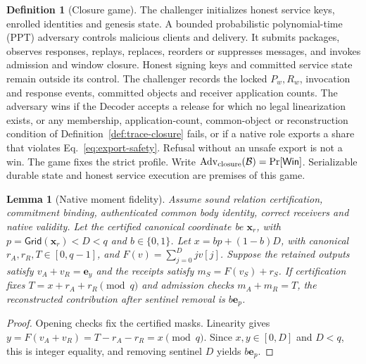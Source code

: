 \documentclass[conference,compsoc]{IEEEtran}
\theoremstyle{definition}
\newtheorem{definition}{Definition}[section]
\newtheorem{definition}{Definition}
\numberwithin{equation}{section}
\numberwithin{table}{section}
\numberwithin{figure}{section}
\theoremstyle{plain}
\newtheorem{lemma}{Lemma}[section]
\newtheorem{lemma}{Lemma}
\begin{document}
\begin{definition}[Closure game]
\label{game:closure}
The challenger initializes honest service keys, enrolled identities and genesis
state. A bounded probabilistic polynomial-time (PPT) adversary controls malicious clients and delivery. It
submits packages, observes responses, replays, replaces, reorders or suppresses
messages, and invokes admission and window closure. Honest signing keys and
committed service state remain outside its control. The challenger records the
locked \(P_w,R_w\), invocation and response events, committed objects and
receiver application counts. The
adversary wins if the Decoder accepts a release for which no legal
linearization exists, or any membership, application-count, common-object
or reconstruction condition of Definition~\ref{def:trace-closure} fails,
or if a
native role exports a share that violates Eq.~\eqref{eq:export-safety}.
Refusal without an unsafe export is not a win. The game fixes the strict
profile. Write
\(\operatorname{Adv}_{\rm closure}(\mathcal B)=\Pr[\mathsf{Win}]\).
Serializable durable state and honest service execution are premises of this game.
\end{definition}

\begin{lemma}[Native moment fidelity]
\label{lem:native-moment-fidelity}
Assume sound relation certification, commitment binding, authenticated common
body identity, correct receivers and native validity. Let the certified
canonical coordinate be \(\mathbf x_r\), with \(p=\mathsf{Grid}(\mathbf x_r)<D<q\)
and \(b\in\{0,1\}\). Let \(x=bp+(1-b)D\), with canonical
\(r_A,r_R,T\in[0,q-1]\), and \(F(v)=\sum_{j=0}^{D}jv[j]\). Suppose the
retained outputs satisfy \(v_A+v_R=\mathbf e_y\) and the receipts satisfy
\(m_S=F(v_S)+r_S\).
If certification fixes \(T=x+r_A+r_R\pmod q\) and admission checks
\(m_A+m_R=T\), the reconstructed contribution after sentinel removal is
\(b\mathbf e_p\).
\end{lemma}
\begin{proof}
Opening checks fix the certified masks. Linearity gives
\(y=F(v_A+v_R)=T-r_A-r_R=x\pmod q\).
Since \(x,y\in[0,D]\) and \(D<q\), this is integer equality, and
removing sentinel \(D\) yields \(b\mathbf e_p\).
\end{proof}
\end{document}
